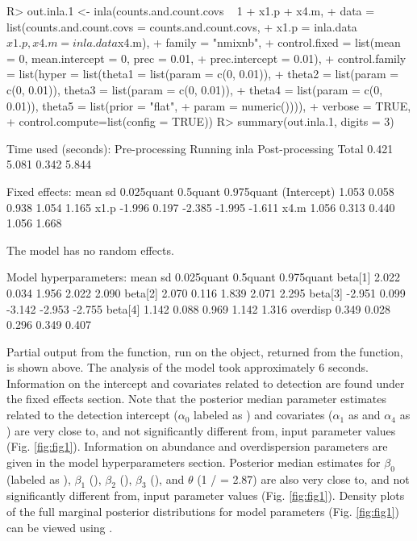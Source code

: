 \documentclass[codesnippet]{jss}
\begin{document}
\begin{CodeInput}
R> out.inla.1 <- inla(counts.and.count.covs ~ 1 + x1.p + x4.m,
+    data = list(counts.and.count.covs = counts.and.count.covs,
+      x1.p = inla.data$x1.p, x4.m = inla.data$x4.m),
+    family = "nmixnb",
+    control.fixed = list(mean = 0, mean.intercept = 0, prec = 0.01,
+      prec.intercept = 0.01),
+    control.family = list(hyper = list(theta1 = list(param = c(0, 0.01)),
+      theta2 = list(param = c(0, 0.01)), theta3 = list(param = c(0, 0.01)),
+      theta4 = list(param = c(0, 0.01)), theta5 = list(prior = "flat",
+      param = numeric()))),
+    verbose = TRUE,
+    control.compute=list(config = TRUE))
R> summary(out.inla.1, digits = 3)
\end{CodeInput}
\begin{CodeOutput}
Time used (seconds):
Pre-processing    Running inla    Post-processing    Total 
0.421             5.081           0.342              5.844 

Fixed effects:
              mean     sd  0.025quant 0.5quant  0.975quant
(Intercept)  1.053  0.058       0.938     1.054      1.165
x1.p        -1.996  0.197      -2.385    -1.995     -1.611
x4.m         1.056  0.313       0.440     1.056      1.668

The model has no random effects.

Model hyperparameters:
                 mean      sd  0.025quant  0.5quant 0.975quant
beta[1]         2.022   0.034       1.956     2.022      2.090
beta[2]         2.070   0.116       1.839     2.071      2.295
beta[3]        -2.951   0.099      -3.142    -2.953     -2.755
beta[4]         1.142   0.088       0.969     1.142      1.316
overdisp        0.349   0.028       0.296     0.349      0.407
\end{CodeOutput}

Partial output from the  function, run on the  object, returned from the  function, is shown above. The analysis of the model took approximately 6 seconds.  Information on the intercept and covariates related to detection are found under the fixed effects section.  Note that the posterior median parameter estimates related to the detection intercept ($\alpha_0$ labeled as ) and covariates ($\alpha_1$ as  and $\alpha_4$ as ) are very close to, and not significantly different from, input parameter values (Fig. \ref{fig:fig1}). Information on abundance and overdispersion parameters are given in the model hyperparameters section. Posterior median estimates for $\beta_0$ (labeled as ), $\beta_1$ (), $\beta_2$ (), $\beta_3$ (), and $\theta$ (1 /  = 2.87) are also very close to, and not significantly different from, input parameter values (Fig. \ref{fig:fig1}). Density plots of the full marginal posterior distributions for model parameters (Fig. \ref{fig:fig1}) can be viewed using .
\end{document}
